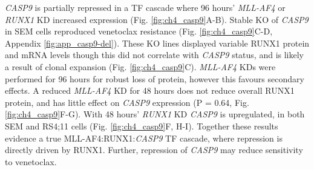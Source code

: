 \textit{CASP9} is partially repressed in a TF cascade where 96 hours' \textit{MLL-AF4} or \textit{RUNX1} KD increased expression (Fig. \ref{fig:ch4_casp9}A-B). Stable KO of \textit{CASP9} in SEM cells reproduced venetoclax resistance (Fig. \ref{fig:ch4_casp9}C-D, Appendix \ref{fig:app_casp9-del}). These KO lines displayed variable RUNX1 protein and mRNA levels though this did not correlate with \textit{CASP9} status, and is likely a result of clonal expansion (Fig. \ref{fig:ch4_casp9}C). \textit{MLL-AF4} KDs were performed for 96 hours for robust loss of protein, however this favours secondary effects. A reduced \textit{MLL-AF4} KD for 48 hours does not reduce overall RUNX1 protein, and has little effect on \textit{CASP9} expression (P = 0.64, Fig. \ref{fig:ch4_casp9}F-G). With 48 hours' \textit{RUNX1} KD \textit{CASP9} is upregulated, in both SEM and RS4;11 cells (Fig. \ref{fig:ch4_casp9}F, H-I). Together these results evidence a true MLL-AF4:RUNX1:\textit{CASP9} TF cascade, where repression is directly driven by RUNX1. Further, repression of \textit{CASP9} may reduce sensitivity to venetoclax.

